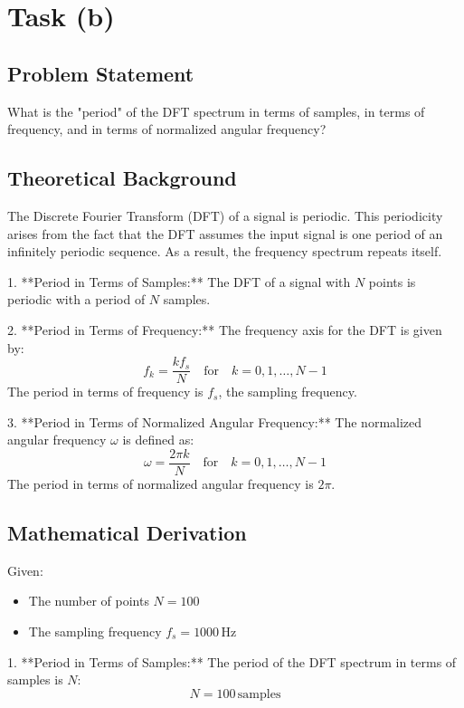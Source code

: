 \item[(b)]
\section*{Task (b)}

\subsection*{Problem Statement}
What is the "period" of the DFT spectrum in terms of samples, in terms of frequency, and in terms of normalized angular frequency?

\subsection*{Theoretical Background}
The Discrete Fourier Transform (DFT) of a signal is periodic. This periodicity arises from the fact that the DFT assumes the input signal is one period of an infinitely periodic sequence. As a result, the frequency spectrum repeats itself.

1. **Period in Terms of Samples:**
   The DFT of a signal with \( N \) points is periodic with a period of \( N \) samples.

2. **Period in Terms of Frequency:**
   The frequency axis for the DFT is given by:
   \[
   f_k = \frac{k f_s}{N} \quad \text{for} \quad k = 0, 1, \ldots, N-1
   \]
   The period in terms of frequency is \( f_s \), the sampling frequency.

3. **Period in Terms of Normalized Angular Frequency:**
   The normalized angular frequency \( \omega \) is defined as:
   \[
   \omega = \frac{2\pi k}{N} \quad \text{for} \quad k = 0, 1, \ldots, N-1
   \]
   The period in terms of normalized angular frequency is \( 2\pi \).

\subsection*{Mathematical Derivation}
Given:
\begin{itemize}
    \item The number of points \( N = 100 \)
    \item The sampling frequency \( f_s = 1000 \, \text{Hz} \)
\end{itemize}

1. **Period in Terms of Samples:**
   The period of the DFT spectrum in terms of samples is \( N \):
   \[
   N = 100 \, \text{samples}
   \]

